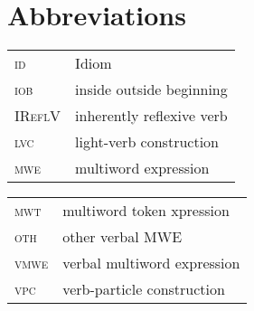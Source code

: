 \documentclass[output=paper,modfonts]{langscibook}
\begin{document}
\section*{Abbreviations}

\begin{tabularx}{.49\textwidth}{ll}
\textsc{id} & Idiom\\ 
\textsc{iob}& inside outside beginning\\ 
\textsc{IReflV} & inherently reflexive verb  \\
\textsc{lvc} & light-verb construction  \\
\textsc{mwe} & multiword expression  \\
\end{tabularx}
\begin{tabularx}{.49\textwidth}{ll}
\textsc{mwt} & multiword token xpression  \\
\textsc{oth} & other verbal MWE \\
\textsc{vmwe} & verbal multiword expression \\
\textsc{vpc} & verb-particle construction  \\ 
\end{tabularx}

\newpage
\printbibliography[heading=subbibliography,notkeyword=this]
\end{document}
